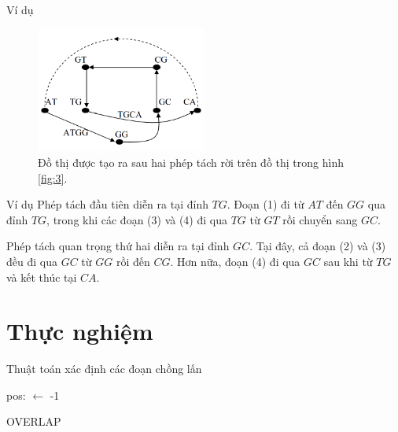 \documentclass[10pt]{beamer}
\theoremstyle{remark}
\numberwithin{algocf}{section}
\numberwithin{equation}{section}
\numberwithin{dl}{section}
\numberwithin{figure}{section}
\begin{document}
\begin{frame}{Ví dụ}
    \begin{figure}[h!]
        \centering
        \includegraphics[width=0.5\textwidth]{8.png}
        \caption{Đồ thị được tạo ra sau hai phép tách rời trên đồ thị trong hình \ref{fig:3}.}
        \label{fig:8}
    \end{figure}

    
\end{frame}

\begin{frame}{Ví dụ}
    Phép tách đầu tiên diễn ra tại đỉnh $TG$. Đoạn (1) đi từ $AT$ đến $GG$ qua đỉnh $TG$, trong khi các đoạn (3) và (4) đi qua $TG$ từ $GT$ rồi chuyển sang $GC$.

    Phép tách quan trọng thứ hai diễn ra tại đỉnh $GC$. Tại đây, cả đoạn (2) và (3) đều đi qua $GC$ từ $GG$ rồi đến $CG$. 
    Hơn nữa, đoạn (4) đi qua $GC$ sau khi từ $TG$ và kết thúc tại $CA$.
\end{frame}

\section{Thực nghiệm}

\begin{frame}{Thuật toán xác định các đoạn chồng lấn}
    \begin{algorithm}[H]
        \DontPrintSemicolon
        pos:  $\gets$ -1\;
        \;
        \caption{OVERLAP}
    \end{algorithm}
\end{frame}
\end{document}
